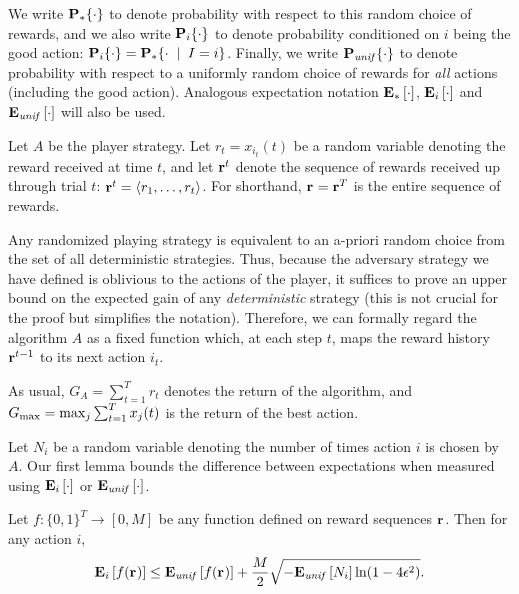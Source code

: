 \documentclass[12pt]{article}
\newcommand{\x}[2]{x_{#1}({#2})}
\renewcommand{\i}[1]{i_{#1}}
\newcommand{\xit}{\x{\i{t}}{t}}
\newcommand{\Gactbest}{G_{\rm max}}
\newcommand{\distcom}[2]{#1 \{#2\}}
\newcommand{\Pud}{{\bf P}_{\it unif}}
\newcommand{\Ped}{{\bf P}_{*}}
\newcommand{\Peid}{{\bf P}_{i}}
\newcommand{\Pu}[1]{\distcom{\Pud}{#1}} %
\newcommand{\Pe}[1]{\distcom{\Ped}{#1}}  %
\newcommand{\Pei}[1]{\distcom{\Peid}{#1}}%
\newcommand{\Eu}[1]{{\bf E}_{\it unif} \left[#1\right]}
\newcommand{\Ee}[1]{{\bf E}_{*} \left[#1\right]}
\newcommand{\Ei}[1]{{\bf E}_{i} \left[#1\right]}
\newcommand{\gooda}{{I}}
\renewcommand{\r}[1]{{r_{#1}}}
\newcommand{\rvec}[1]{{{\bf r}^{#1}}}
\newcommand{\rv}{\rvec{}}
\newcommand{\given}{\;\mid\;}
\newcommand{\numai}{{N_i}}
\newcommand{\lneps}{\ln(1-4\epsilon^2)}
\begin{document}
We write $\Pe{\cdot}$ to denote probability with respect to this
random choice of rewards, and we also write $\Pei{\cdot}$ to denote
probability conditioned on $i$ being the good action:
$\Pei{\cdot} = \Pe{\cdot \given \gooda = i}$.
Finally, we write $\Pu{\cdot}$ to denote probability with respect to a
uniformly random choice of rewards for {\em all\/} actions (including
the good action).
Analogous expectation notation $\Ee{\cdot}$, $\Ei{\cdot}$ and
$\Eu{\cdot}$ will also be used.

Let $A$ be the player strategy.
Let $\r{t}=\xit$ be a random variable denoting the reward received
at time $t$, and let $\rvec{t}$ denote the sequence of rewards
received up through trial $t$:
$\rvec{t} = \langle \r{1},\ldots,\r{t}\rangle$.
For shorthand, $\rv=\rvec{T}$ is the entire sequence of
rewards.

Any randomized playing strategy is equivalent to an a-priori
random choice from the set of all deterministic strategies. 
Thus, because the adversary strategy we have defined is oblivious to
the actions of the player,
it suffices to prove an upper bound on the expected gain of any
{\em deterministic\/} strategy (this is not crucial for the proof but
simplifies the notation).
Therefore, we can formally regard the algorithm $A$ as a fixed
function which, at each step $t$, maps the reward history $\rvec{t-1}$ to
its next action $\i{t}$.

As usual, $G_A = \sum_{t=1}^T \r{t}$ denotes the return of the
algorithm, and $\Gactbest = \max_{j} \sum_{t=1}^T \x{j}{t}$ is the
return of the best action.

Let $\numai$ be a random variable denoting the number of times action
$i$ is chosen by $A$.
Our first lemma bounds the difference between expectations when
measured using $\Ei{\cdot}$ or $\Eu{\cdot}$.

\begin{lemma} \label{lem:distdif}
Let $f:\{0,1\}^T\rightarrow [0,M]$ be any function defined on reward
sequences $\rv$.
Then for any action $i$,
\[
\Ei{f(\rv)} \leq \Eu{f(\rv)} + \frac{M}{2} \sqrt{-\Eu{\numai}\lneps}.
\]
\end{lemma}
\end{document}
